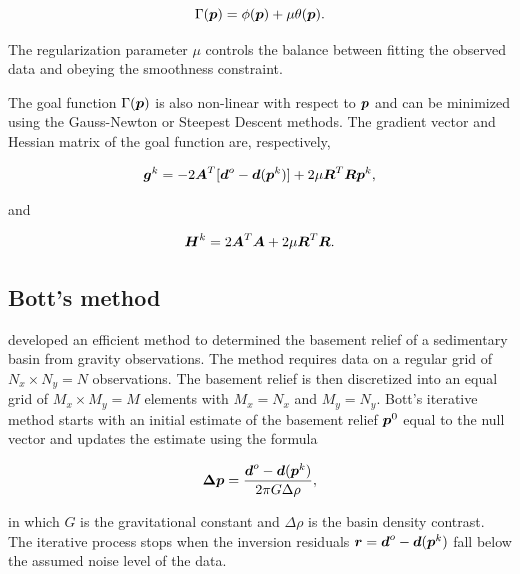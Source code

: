\documentclass[extra,mreferee]{gji}
\newcommand{\mbf}[1]{\hbox{\mathversion{bold}$#1$}}
\begin{document}
\begin{equation}
    \Gamma(\mbf{p}) = \phi(\mbf{p}) + \mu\theta(\mbf{p}).
\end{equation}

\noindent
The regularization parameter $\mu$ controls the balance between fitting the
observed data and obeying the smoothness constraint.

The goal function $\Gamma(\mbf{p})$ is also non-linear with respect to
$\mbf{p}$ and can be minimized using the Gauss-Newton or Steepest Descent
methods.
The gradient vector and Hessian matrix of the goal function are, respectively,

\begin{equation}
    \mbf{g}^k =
        -2\mbf{A}^T[\mbf{d}^o - \mbf{d}(\mbf{p}^k)] +
        2\mu\mbf{R}^T\mbf{R}\mbf{p}^k,
    \label{eq:gradient-regul}
\end{equation}

\noindent and

\begin{equation}
    \mbf{H}^k = 2\mbf{A}^T\mbf{A} + 2\mu\mbf{R}^T\mbf{R}.
    \label{eq:hessian-regul}
\end{equation}



\subsection{Bott's method}

\citet{bott_use_1960} developed an efficient method to determined the basement
relief of a sedimentary basin from gravity observations.
The method requires data on a regular grid of $N_x \times N_y = N$
observations.
The basement relief is then discretized into an equal grid of $M_x \times
M_y = M$ elements with $M_x = N_x$ and $M_y = N_y$.
Bott's iterative method starts with an initial estimate of the basement relief
$\mbf{p}^0$ equal to the null vector and updates the estimate using the formula

\begin{equation}
    \mbf{\Delta p} = \dfrac{\mbf{d}^o - \mbf{d}(\mbf{p}^k)}{2\pi G \Delta \rho},
    \label{eq:bott}
\end{equation}

\noindent
in which $G$ is the gravitational constant and $\Delta \rho$ is the basin
density contrast.
The iterative process stops when the inversion residuals
$\mbf{r} = \mbf{d}^o - \mbf{d}(\mbf{p}^k)$ fall below the assumed noise level
of the data.
\end{document}
